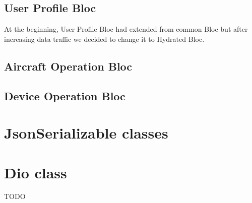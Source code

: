 \subsection{User Profile Bloc}\label{subsec:user-profile-bloc}
At the beginning, User Profile Bloc had extended from common Bloc but after increasing data traffic we decided to change it to Hydrated Bloc.


\subsection{Aircraft Operation Bloc}\label{subsec:aircraft-operation-bloc}

\subsection{Device Operation Bloc}\label{subsec:device-operation-bloc}



\section{JsonSerializable classes}\label{sec:jsonserializable-classes}


\section{Dio class}\label{sec:dio-class}

TODO